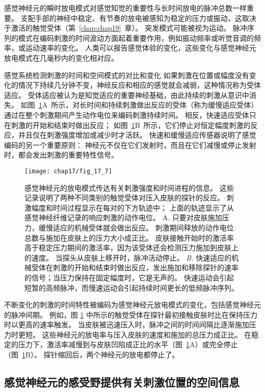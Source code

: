 感觉神经元的瞬时放电模式对感觉知觉的重要性与长时间放电的脉冲总数一样重要。 
支配手部的神经中稳定、有节奏的放电被感知为稳定的压力或振动，这取决于激活的触觉受体（第~\ref{chap:chap19}~章）。 
突发模式可能被视为运动。 
脉冲序列的模式在编码刺激的时间波动方面起着重要作用，例如振动频率或听觉音调的频率，或运动速率的变化。 
人类可以报告感觉体验的变化，这些变化与感觉神经元放电模式在几毫秒内的变化相对应。


感觉系统检测刺激的时间和空间模式的对比和变化
如果刺激在位置或幅度没有变化的情况下持续几分钟不变，神经反应和相应的感觉就会减弱，这种情况称为受体适应。 
受体适应被认为是知觉适应的重要神经基础，由此持续的刺激从意识中消失。
如图~\ref{fig:17_7}A~所示，对长时间和持续刺激做出反应的受体（称为缓慢适应受体）通过在整个刺激期间产生动作电位来编码刺激持续时间。
相反，快速适应受体只在刺激的开始和结束时做出反应； 
如图~\ref{fig:17_7}B~所示，它们停止对恒定幅度刺激的反应，并且仅在刺激强度增加或减少时才活跃。
快速和缓慢适应传感器说明了感觉编码的另一个重要原则：
神经元不仅在它们发射时，而且在它们减慢或停止发射时，都会发出刺激的重要特性信号。


\begin{figure}[htbp]
	\centering
	\texttt{[image: chap17/fig\_17\_7]}
	\caption{感觉神经元的放电模式传达有关刺激强度和时间进程的信息。
		这些记录说明了两种不同类别的触觉受体对压入皮肤的探针的反应。 
		刺激幅度和时间过程显示在每对的下方轨迹中； 
		上面的轨迹显示了从感觉神经纤维记录的响应刺激的动作电位。 
		A. 只要对皮肤施加压力，缓慢适应的机械受体就会做出反应。 
		刺激期间释放的动作电位总数与施加在皮肤上的压力大小成正比。
		皮肤接触开始时的激活率高于稳定压力期间的激活率，因为该受体还会检测压力施加到皮肤上的速度。
		当探头从皮肤上移开时，脉冲活动停止\cite{mountcastle1966neural}。
		\textit{B.} 快速适应的机械受体在刺激的开始和结束时做出反应，发出施加和移除探针的速率的信号；当压力保持在固定幅度时，它是无声的。
		快速运动会引起短暂的高频脉冲，而慢速运动会引起持续时间更长的低频脉冲序列\cite{talbot1968sense}。}
	\label{fig:17_7}
\end{figure}


不断变化的刺激的时间特性被编码为感觉神经元放电模式的变化，包括感觉神经元的脉冲间期。
例如，图 \ref{fig:17_7} 中所示的触觉受体在探针最初接触皮肤时比在保持压力时以更高的速率触发。
当皮肤被迅速压入时，脉冲之间的时间间隔比逐渐施加压力时更短。
这些神经元的放电率与压入皮肤的速度和施加的总压力成正比。
在稳定的压力下，激活率减慢到与皮肤凹陷成正比的水平（图~\ref{fig:17_7}A）或完全停止（图~\ref{fig:17_7}B）。
探针缩回后，两个神经元的放电都停止了。


\subsection{感觉神经元的感受野提供有关刺激位置的空间信息}

